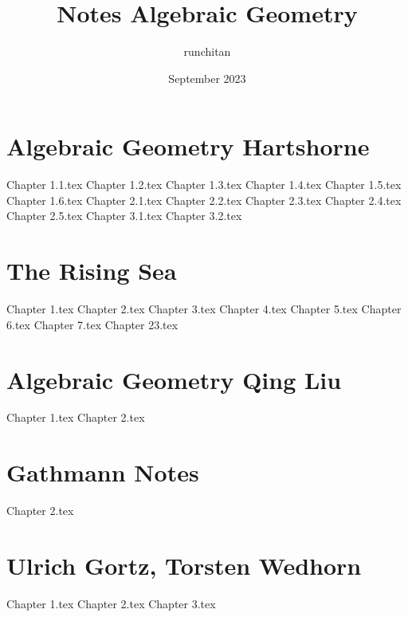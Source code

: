 \documentclass{article}
\title{Notes Algebraic Geometry}
\author{runchitan }
\date{September 2023}
\begin{document}

\tableofcontents

\newpage\part{Algebraic Geometry Hartshorne}
{Chapter 1.1.tex}
{Chapter 1.2.tex}
{Chapter 1.3.tex}
{Chapter 1.4.tex}
{Chapter 1.5.tex}
{Chapter 1.6.tex}
{Chapter 2.1.tex}
{Chapter 2.2.tex}
{Chapter 2.3.tex}
{Chapter 2.4.tex}
{Chapter 2.5.tex}
{Chapter 3.1.tex}
{Chapter 3.2.tex}

\newpage\part{The Rising Sea}
{Chapter 1.tex}
{Chapter 2.tex}
{Chapter 3.tex}
{Chapter 4.tex}
{Chapter 5.tex}
{Chapter 6.tex}
{Chapter 7.tex}
{Chapter 23.tex}

\newpage\part{Algebraic Geometry Qing Liu}
{Chapter 1.tex}
{Chapter 2.tex}

\newpage\part{Gathmann Notes}
{Chapter 2.tex}

\newpage\part{Ulrich Gortz, Torsten Wedhorn}
{Chapter 1.tex}
{Chapter 2.tex}
{Chapter 3.tex}

\newpage


\end{document}
